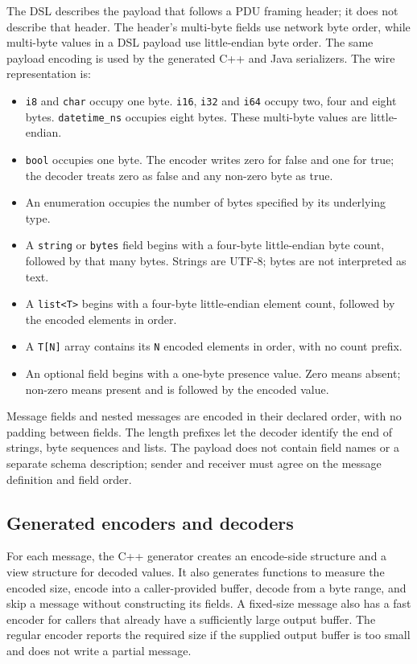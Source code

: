 The DSL describes the payload that follows a PDU framing header; it does not
describe that header. The header's multi-byte fields use network byte order,
while multi-byte values in a DSL payload use little-endian byte order. The
same payload encoding is used by the generated C++ and Java serializers.
The wire representation is:
\begin{itemize}[nosep]
  \item \texttt{i8} and \texttt{char} occupy one byte. \texttt{i16},
        \texttt{i32} and \texttt{i64} occupy two, four and eight bytes.
        \texttt{datetime\_ns} occupies eight bytes. These multi-byte values
        are little-endian.
  \item \texttt{bool} occupies one byte. The encoder writes zero for false
        and one for true; the decoder treats zero as false and any non-zero
        byte as true.
  \item An enumeration occupies the number of bytes specified by its
        underlying type.
  \item A \texttt{string} or \texttt{bytes} field begins with a four-byte
        little-endian byte count, followed by that many bytes. Strings are
        UTF-8; bytes are not interpreted as text.
  \item A \texttt{list<T>} begins with a four-byte little-endian element
        count, followed by the encoded elements in order.
  \item A \texttt{T[N]} array contains its \texttt{N} encoded elements in
        order, with no count prefix.
  \item An optional field begins with a one-byte presence value. Zero means
        absent; non-zero means present and is followed by the encoded value.
\end{itemize}

Message fields and nested messages are encoded in their declared order, with
no padding between fields. The length prefixes let the decoder identify the
end of strings, byte sequences and lists. The payload does not contain field
names or a separate schema description; sender and receiver must agree on the
message definition and field order.

\subsection{Generated encoders and decoders}

For each message, the C++ generator creates an encode-side structure and a
view structure for decoded values. It also generates functions to measure the
encoded size, encode into a caller-provided buffer, decode from a byte range,
and skip a message without constructing its fields. A fixed-size message also
has a fast encoder for callers that already have a sufficiently large output
buffer. The regular encoder reports the required size if the supplied output
buffer is too small and does not write a partial message.

